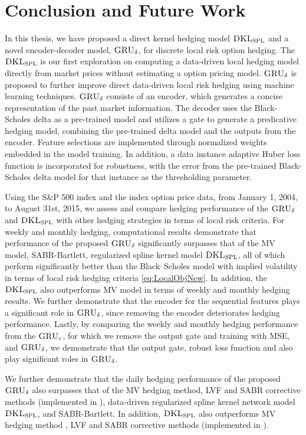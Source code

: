 \documentclass[letterpaper,12pt,titlepage,oneside,final]{book}
\numberwithin{equation}{section}
\theoremstyle{definition}
\newcommand{\model}{\textsc{GRU}_\delta}
\newcommand{\DKLs}{\bf\textsc{DKL}_{\text{SPL}}}
\begin{document}
\chapter{Conclusion and Future Work}
\label{sec:Conclusion}

In this thesis, we have proposed a direct kernel hedging model $\DKLs$ and a novel encoder-decoder  model, $\model$, for discrete local risk option hedging. The $\DKLs$ is our first exploration on computing a data-driven local hedging model directly from market prices without estimating a option pricing model. $\model$ is proposed to further improve direct data-driven local risk hedging using machine learning techniques. $\model$ consists of an encoder, which generates a concise representation of the past market  information. The decoder uses the Black-Scholes delta as a pre-trained model and utilizes a gate to generate a predicative hedging model,  combining the pre-trained delta model and the outputs from the encoder. Feature selections are implemented through normalized weights embedded in the model training. In addition, a data instance adaptive Huber loss function is incorporated  for robustness, with the error from the pre-trained Black-Scholes delta model for that instance as the thresholding parameter. 

Using the S\&P 500 index and the index option price data,  from January 1, 2004, to  August 31st, 2015, we assess and compare hedging performance of the  $\model$ and $\DKLs$ with other hedging strategies in terms of local risk criteria.
For weekly and monthly hedging, computational results demonstrate that performance of the proposed $\model$  significantly surpasses that of the MV model, SABR-Bartlett, regularized spline kernel model $\DKLs$, all of which perform significantly better than the Black–Scholes model with implied volatility in terms of local risk hedging criteria \eqref{eq:LocalObjNew}.
In addition, the $\DKLs$ also outperforms MV model in terms of weekly and monthly hedging results.
We further demonstrate that the encoder for the sequential features plays a significant role in $\model$, since removing the encoder deteriorates hedging performance.
Lastly, by comparing the weekly and monthly hedging performance from the  $\textsc{GRU}_{c}$, for which we remove the output gate and training with MSE, and $\model$, we demonstrate that the output gate,  robust loss function and  also play  significant roles in $\model$.

We further demonstrate that the daily hedging performance of the proposed $\model$  also surpasses that of the MV hedging method, LVF and SABR corrective methods  (implemented in \cite{hulloptimal}), data-driven regularized spline kernel network model $\DKLs$, and SABR-Bartlett. In addition, $\DKLs$ also outperforms MV hedging method , LVF and SABR corrective methods  (implemented in \cite{hulloptimal}).
\end{document}
